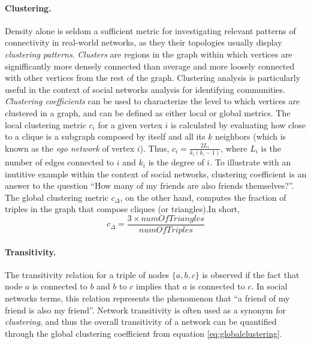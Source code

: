 \paragraph*{Clustering.}
Density alone is seldom a sufficient metric for investigating relevant patterns of connectivity in real-world networks, as they their topologies usually display \textit{clustering patterns}.
\textit{Clusters} are regions in the graph within which vertices are signifficantly more densely connected than average and more loosely connected with other vertices from the rest of the graph. 
Clustering analysis is particularly useful in the context of social networks analysis for identifying communities.
%
\textit{Clustering coefficients} can be used to characterize the level to which vertices are clustered in a graph, and can be defined as either local or global metrics.
The local clustering metric $c_i$ for a given vertex $i$ is calculated by evaluating how close to a clique is a subgraph composed by itself and all its $k$ neighbors (which is known as the \textit{ego network} of vertex $i$). Thus, $c_i = \frac{2L_i}{k_i(k_i - 1)}$, where $L_i$ is the number of edges connected to $i$ and $k_i$ is the degree of $i$.
To illustrate with an inutitive example within the context of social networks, clustering coefficient is an answer to the question ``How many of my friends are also friends themselves?''.
%
The global clustering metric $c_{\Delta}$, on the other hand, computes the fraction of triples in the graph that compose cliques (or triangles).In short, \begin{equation}\label{eq:globalclustering}
c_{\Delta} = \frac{3 \times numOfTriangles}{numOfTriples}
\end{equation}

\paragraph*{Transitivity.}
The transitivity relation for a triple of nodes $\{a,b,c\}$ is observed if the fact that node $a$ is connected to $b$ and $b$ to $c$ implies that $a$ is connected to $c$.
In social networks terms, this relation represents the phenomenon that ``a friend of my friend is also my friend''.
Network transitivity is often used as a synonym for \textit{clustering}, and thus the overall transitivity of a network can be quantified through the global clustering coefficient from equation \ref{eq:globalclustering}.




